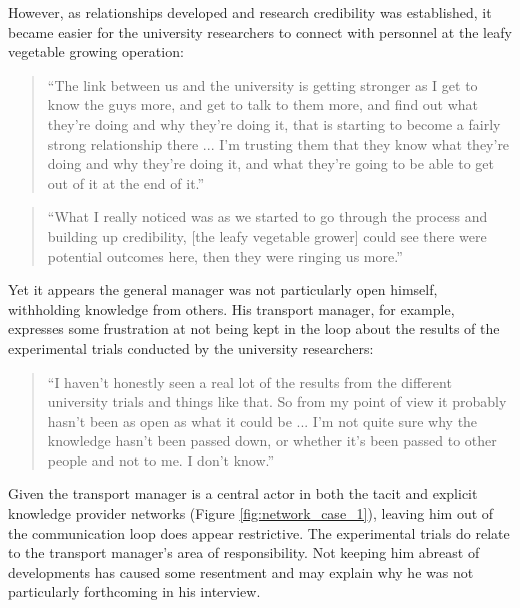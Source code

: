 However, as relationships developed and research credibility was established, it became easier for the university researchers to connect with personnel at the leafy vegetable growing operation:

\begin{quote}
\small
\enquote{The link between us and the university is getting stronger as I get to know the guys more, and get to talk to them more, and find out what they're doing and why they're doing it, that is starting to become a fairly strong relationship there ... I'm trusting them that they know what they’re doing and why they’re doing it, and what they're going to be able to get out of it at the end of it.} \\
\end{quote}

\begin{quote}
\small
\enquote{What I really noticed was as we started to go through the process and building up credibility, [the leafy vegetable grower] could see there were potential outcomes here, then they were ringing us more.} \\
\end{quote}

Yet it appears the general manager was not particularly open himself, withholding knowledge from others. His transport manager, for example, expresses some frustration at not being kept in the loop about the results of the experimental trials conducted by the university researchers:

\begin{quote}
\small
\enquote{I haven't honestly seen a real lot of the results from the different university trials and things like that. So from my point of view it probably hasn't been as open as what it could be ... I'm not quite sure why the knowledge hasn't been passed down, or whether it's been passed to other people and not to me. I don't know.} \\
\end{quote}

Given the transport manager is a central actor in both the tacit and explicit knowledge provider networks (Figure \ref{fig:network_case_1}), leaving him out of the communication loop does appear restrictive. The experimental trials do relate to the transport manager's area of responsibility. Not keeping him abreast of developments has caused some resentment and may explain why he was not particularly forthcoming in his interview. \medskip

